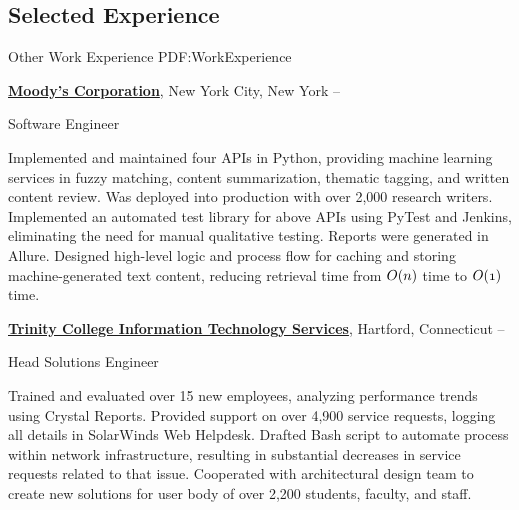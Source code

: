 \documentclass[letterpaper,10pt,oneside]{article}
\begin{document}
\begin{body}
\noindent\hrulefill
\section
{Selected\newline
Experience}
{Other Work Experience}
{PDF:WorkExperience}

\href{http://www.moodys.com}
{\textbf{Moody's Corporation}},
New York City, New York
\hfill
{} --

\GapNoBreak
\BulletItem
Software Engineer
\begin{detail}
\SubBulletItem
Implemented and maintained four APIs in Python, providing machine learning services in fuzzy matching, content summarization, thematic tagging, and written content review. Was deployed into production with over 2,000 research writers.
\SubBulletItem
Implemented an automated test library for above APIs using PyTest and Jenkins, eliminating the need for manual qualitative testing. Reports were generated in Allure.
\SubBulletItem
Designed high-level logic and process flow for caching and storing machine-generated text content, reducing retrieval time from $\mathnormal{O(n)}$ time to $\mathnormal{O(1)}$ time.
\end{detail}

\begin{comment}
\BigGapNoBreak
{\textbf{Trinity College Office of Enrollment}},
Hartford, Connecticut
\hfill
\DatestampYMD{2017}{08}{21} --
\DatestampYMD{2018}{05}{18}


\GapNoBreak
\BulletItem
Student Admissions Associate
\begin{detail}
\SubBulletItem
Conducted interviews with over 50 high school students, evaluating their standing as applicants, which resulted in 11 admitted students for the Class of 2022.
\SubBulletItem
Submitted written evaluations on each applicant to be added to applicant’s file.
\SubBulletItem
Led weekly group information sessions for prospective students, families, and admissions visitors.
\SubBulletItem
Participated in on-campus recruitment events, such as panels, special programs, and other projects.
\end{detail}
\end{comment}

\BigGapNoBreak
\href{http://www.trincoll.edu}
{\textbf{Trinity College Information Technology Services}},
Hartford, Connecticut
\hfill
{} --

\GapNoBreak
\BulletItem
Head Solutions Engineer
\begin{detail}
\SubBulletItem
Trained and evaluated over 15 new employees, analyzing performance trends using Crystal Reports.
\SubBulletItem
Provided support on over 4,900 service requests, logging all details in SolarWinds Web Helpdesk.
\SubBulletItem
Drafted Bash script to automate process within network infrastructure, resulting in substantial decreases in service requests related to that issue.
\SubBulletItem
Cooperated with architectural design team to create new solutions for user body of over 2,200 students, faculty, and staff.
\end{detail}


\end{body}
\end{document}
